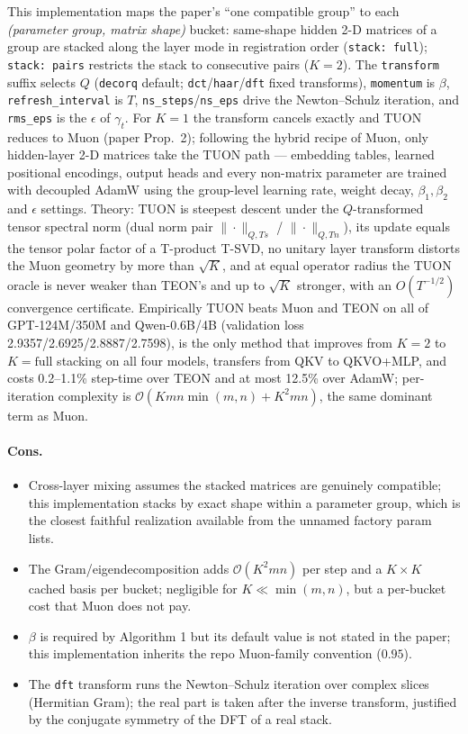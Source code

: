 This implementation maps the paper's ``one compatible group'' to each
\emph{(parameter group, matrix shape)} bucket: same-shape hidden 2-D matrices of a group
are stacked along the layer mode in registration order (\texttt{stack: full});
\texttt{stack: pairs} restricts the stack to consecutive pairs ($K=2$). The
\texttt{transform} suffix selects $Q$ (\texttt{decorq} default;
\texttt{dct}/\texttt{haar}/\texttt{dft} fixed transforms), \texttt{momentum} is $\beta$,
\texttt{refresh\_interval} is $T$, \texttt{ns\_steps}/\texttt{ns\_eps} drive the
Newton--Schulz iteration, and \texttt{rms\_eps} is the $\epsilon$ of $\gamma_t$. For
$K=1$ the transform cancels exactly and TUON reduces to Muon (paper Prop.~2); following
the hybrid recipe of Muon, only hidden-layer 2-D matrices take the TUON path ---
embedding tables, learned positional encodings, output heads and every non-matrix
parameter are trained with decoupled AdamW using the group-level learning rate, weight
decay, $\beta_1, \beta_2$ and $\epsilon$ settings. Theory: TUON is steepest descent under
the $Q$-transformed tensor spectral norm (dual norm pair $\|\cdot\|_{Q,Ts}$ /
$\|\cdot\|_{Q,Tn}$), its update equals the tensor polar factor of a T-product T-SVD, no
unitary layer transform distorts the Muon geometry by more than $\sqrt{K}$, and at equal
operator radius the TUON oracle is never weaker than TEON's and up to $\sqrt{K}$
stronger, with an $O(T^{-1/2})$ convergence certificate. Empirically TUON beats Muon and
TEON on all of GPT-124M/350M and Qwen-0.6B/4B (validation loss
2.9357/2.6925/2.8887/2.7598), is the only method that improves from $K{=}2$ to
$K{=}\mathrm{full}$ stacking on all four models, transfers from QKV to QKVO+MLP, and
costs 0.2--1.1\% step-time over TEON and at most 12.5\% over AdamW; per-iteration
complexity is $\mathcal{O}(Kmn\min(m,n) + K^2 mn)$, the same dominant term as Muon.

\paragraph{Cons.}
\begin{itemize}[leftmargin=*]
\item Cross-layer mixing assumes the stacked matrices are genuinely compatible; this
  implementation stacks by exact shape within a parameter group, which is the closest
  faithful realization available from the unnamed factory param lists.
\item The Gram/eigendecomposition adds $\mathcal{O}(K^2 mn)$ per step and a $K \times K$
  cached basis per bucket; negligible for $K \ll \min(m, n)$, but a per-bucket cost that
  Muon does not pay.
\item $\beta$ is required by Algorithm 1 but its default value is not stated in the
  paper; this implementation inherits the repo Muon-family convention ($0.95$).
\item The \texttt{dft} transform runs the Newton--Schulz iteration over complex slices
  (Hermitian Gram); the real part is taken after the inverse transform, justified by the
  conjugate symmetry of the DFT of a real stack.
\end{itemize}

